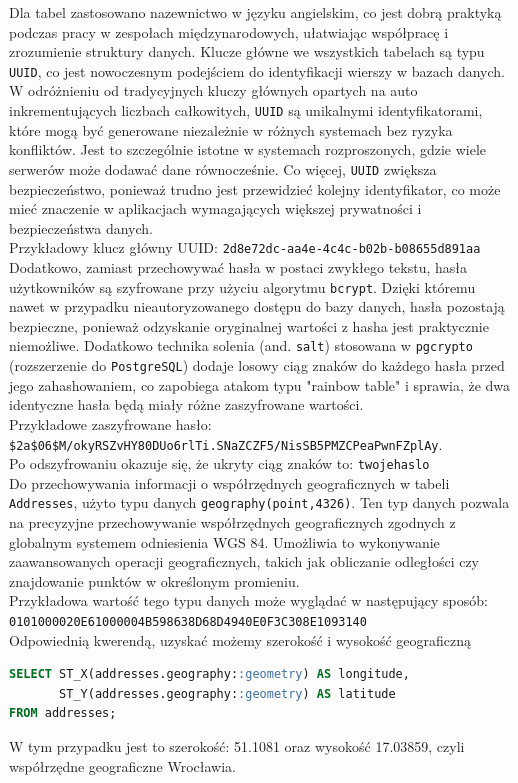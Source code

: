 Dla tabel zastosowano nazewnictwo w języku angielskim, co jest dobrą praktyką podczas pracy w zespołach międzynarodowych, ułatwiając współpracę i zrozumienie struktury danych. Klucze główne we wszystkich tabelach są typu \texttt{UUID}, co jest nowoczesnym podejściem do identyfikacji wierszy w bazach danych. W odróżnieniu od tradycyjnych kluczy głównych opartych na auto inkrementujących liczbach całkowitych, \texttt{UUID} są unikalnymi identyfikatorami, które mogą być generowane niezależnie w różnych systemach bez ryzyka konfliktów. Jest to szczególnie istotne w systemach rozproszonych, gdzie wiele serwerów może dodawać dane równocześnie. Co więcej, \texttt{UUID} zwiększa bezpieczeństwo, ponieważ trudno jest przewidzieć kolejny identyfikator, co może mieć znaczenie w aplikacjach wymagających większej prywatności i bezpieczeństwa danych. \\
Przykładowy klucz główny UUID: \texttt{2d8e72dc-aa4e-4c4c-b02b-b08655d891aa} \\

Dodatkowo, zamiast przechowywać hasła w postaci zwykłego tekstu, hasła użytkowników są szyfrowane przy użyciu algorytmu \texttt{bcrypt}. Dzięki któremu nawet w przypadku nieautoryzowanego dostępu do bazy danych, hasła pozostają bezpieczne, ponieważ odzyskanie oryginalnej wartości z hasha jest praktycznie niemożliwe. Dodatkowo technika solenia (and. \texttt{salt}) stosowana w \texttt{pgcrypto} (rozszerzenie do \texttt{PostgreSQL}) dodaje losowy ciąg znaków do każdego hasła przed jego zahashowaniem, co zapobiega atakom typu "rainbow table" i sprawia, że dwa identyczne hasła będą miały różne zaszyfrowane wartości. \\
Przykładowe zaszyfrowane hasło: \\
\texttt{\$2a\$06\$M/okyRSZvHY80DUo6rlTi.SNaZCZF5/NisSB5PMZCPeaPwnFZplAy}. \\
Po odszyfrowaniu okazuje się, że ukryty ciąg znaków to: \texttt{twojehaslo} \\

Do przechowywania informacji o współrzędnych geograficznych w tabeli \texttt{Addresses}, użyto typu danych \texttt{geography(point,4326)}. Ten typ danych pozwala na precyzyjne przechowywanie współrzędnych geograficznych zgodnych z globalnym systemem odniesienia WGS 84. Umożliwia to wykonywanie zaawansowanych operacji geograficznych, takich jak obliczanie odległości czy znajdowanie punktów w określonym promieniu. \\
Przykładowa wartość tego typu danych może wyglądać w następujący sposób: \\
\texttt{0101000020E61000004B598638D68D4940E0F3C308E1093140} \\
Odpowiednią kwerendą, uzyskać możemy szerokość i wysokość geograficzną \\
{\belowcaptionskip=-9pt
\begin{lstlisting}[language=SQL,caption=Przykład kwerendy SQL, label=lst:sql_query]
SELECT ST_X(addresses.geography::geometry) AS longitude, 
       ST_Y(addresses.geography::geometry) AS latitude 
FROM addresses;
\end{lstlisting}
}
W tym przypadku jest to szerokość: 51.1081 oraz wysokość 17.03859, czyli współrzędne geograficzne Wrocławia.